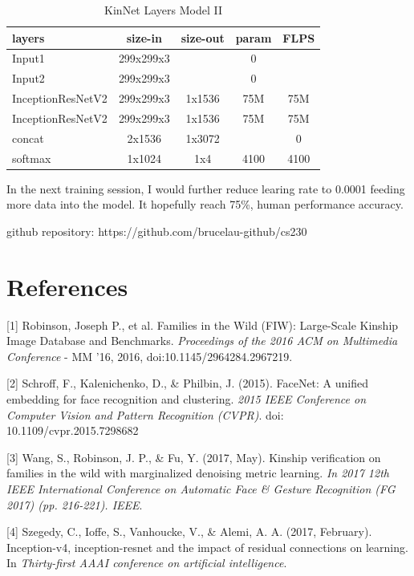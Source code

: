 \documentclass{article}
\begin{document}
\begin{table}[h]
	\centering
	\begin{tabular}{ | l | c | c | c | c |}
		\hline
		\textbf{layers}&\textbf{size-in}&\textbf{size-out}&\textbf{param}&\textbf{FLPS}\\
		\hline
			Input1 & 299x299x3 & & 0 & \\
			Input2 & 299x299x3 & & 0 & \\
			InceptionResNetV2 & 299x299x3 & 1x1536 & 75M & 75M \\
			InceptionResNetV2 & 299x299x3 & 1x1536 & 75M & 75M \\
			concat & 2x1536 & 1x3072 & & 0 \\
			softmax & 1x1024 & 1x4 & 4100 & 4100 \\
		\hline
	\end{tabular}
	\caption{KinNet Layers Model II}
	\label{table:3}
\end{table}

In the next training session, I would further reduce learing rate to 0.0001 feeding more data into the model. It hopefully reach 75\%, human performance accuracy.

github repository: https://github.com/brucelau-github/cs230

\newpage
\section*{References}
\medskip
\small
[1] Robinson, Joseph P., et al. Families in the Wild (FIW): Large-Scale Kinship
Image Database and Benchmarks. {\it Proceedings of the 2016 ACM on Multimedia
Conference} - MM '16, 2016, doi:10.1145/2964284.2967219.

[2] Schroff, F., Kalenichenko, D., \& Philbin, J. (2015). FaceNet: A unified
embedding for face recognition and clustering. {\it 2015 IEEE Conference on
Computer Vision and Pattern Recognition (CVPR)}. doi: 10.1109/cvpr.2015.7298682

[3] Wang, S., Robinson, J. P., \& Fu, Y. (2017, May). Kinship verification on
families in the wild with marginalized denoising metric learning. {\it In 2017 12th
IEEE International Conference on Automatic Face \& Gesture Recognition (FG 2017)
(pp. 216-221). IEEE}.

[4] Szegedy, C., Ioffe, S., Vanhoucke, V., \& Alemi, A. A. (2017, February).
Inception-v4, inception-resnet and the impact of residual connections on
learning. In {\it Thirty-first AAAI conference on artificial intelligence}.
\end{document}
